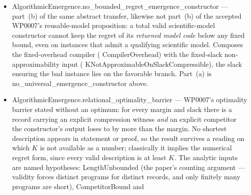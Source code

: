 \documentclass[11pt,a4paper]{article}
\newcommand{\lean}[1]{{\ttfamily\small
  \let\leanunderscore\_\def\_{\leanunderscore\allowbreak}#1}}
\begin{document}
\begin{itemize}[leftmargin=1.4em,itemsep=1pt]
optimality barrier in the form the paper states: unbounded additive regret already on
\emph{compressible} records. Strictly stronger than the unconditional statement above, and
required by the paper's existence/construction tree, in which both computational barriers live on
the branch where a compression gap exists. The AIT input is
\lean{KNotApproximableOnCompressible}, the padded-witness strengthening of
\lean{KNotApproximable}: running the Berry-with-slack diagonal over $\mathrm{pad}(z)=z0^{|z|}$,
which is compressible for long $z$ while $K(\mathrm{pad}(z))\ge K(z)-O(1)$ remains unbounded,
yields a compressible witness. Assumed here; the argument is in the declaration's docstring.
WP0007 (accepted edition) does not contain it: its optimality barrier is proved from the
blind-spot proposition, which applies to valid constructors and uses injectivity, not to an
arbitrary computable $f$. \lean{no\_additive\_approximation\_compressible\_finite\_horizon} and
\lean{no\_universal\_compressor\_finite\_horizon} specialize the two barriers to a record-preserving
embedding $e\circ\nu$, WP0007's finite-horizon inheritance corollary.
\item \lean{AlgorithmicEmergence.no\_bounded\_regret\_emergence\_constructor} --- part~(b) of
the same abstract transfer, likewise not part~(b) of the accepted WP0007's reusable-model proposition: a total valid scientific-model constructor cannot keep the
regret of its \emph{returned model code} below any fixed bound, even on instances that admit a
qualifying scientific model. Composes the fixed-overhead compiler
(\lean{CompilerOverhead}) with the fixed-slack non-approximability input
(\lean{KNotApproximableOnSlackCompressible}), the slack ensuring the bad instance lies on the
favorable branch. Part~(a) is \lean{no\_universal\_emergence\_constructor} above.
\item \lean{AlgorithmicEmergence.relational\_optimality\_barrier} --- WP0007's optimality
barrier stated without an optimum: for every margin and slack there is a record carrying an explicit
compression witness \emph{and} an explicit competitor the constructor's output loses to by more than
the margin. No shortest description appears in statement or proof, so the result survives a reading
on which $K$ is not available as a number; classically it implies the numerical regret form, since
every valid description is at least $K$. The analytic inputs are named hypotheses:
\lean{LengthUnbounded} (the paper's counting argument --- validity forces distinct programs for
distinct records, and only finitely many programs are short), \lean{CompetitorBound} and

\end{itemize}
\end{document}
